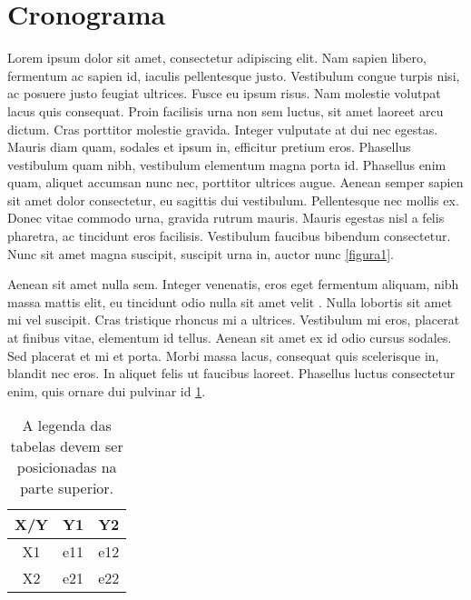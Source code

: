 \section{Cronograma}
Lorem ipsum dolor sit amet, consectetur adipiscing elit. Nam sapien libero, fermentum ac sapien id, iaculis pellentesque justo. Vestibulum congue turpis nisi, ac posuere justo feugiat ultrices. Fusce eu ipsum risus. Nam molestie volutpat lacus quis consequat. Proin facilisis urna non sem luctus, sit amet laoreet arcu dictum. Cras porttitor molestie gravida. Integer vulputate at dui nec egestas. Mauris diam quam, sodales et ipsum in, efficitur pretium eros. Phasellus vestibulum quam nibh, vestibulum elementum magna porta id. Phasellus enim quam, aliquet accumsan nunc nec, porttitor ultrices augue. Aenean semper sapien sit amet dolor consectetur, eu sagittis dui vestibulum. Pellentesque nec mollis ex. Donec vitae commodo urna, gravida rutrum mauris. Mauris egestas nisl a felis pharetra, ac tincidunt eros facilisis. Vestibulum faucibus bibendum consectetur. Nunc sit amet magna suscipit, suscipit urna in, auctor nunc \ref{figura1}.

Aenean sit amet nulla sem. Integer venenatis, eros eget fermentum aliquam, nibh massa mattis elit, eu tincidunt odio nulla sit amet velit \cite{knuth:84}. Nulla lobortis sit amet mi vel suscipit. Cras tristique rhoncus mi a ultrices. Vestibulum mi eros, placerat at finibus vitae, elementum id tellus. Aenean sit amet ex id odio cursus sodales. Sed placerat et mi et porta. Morbi massa lacus, consequat quis scelerisque in, blandit nec eros. In aliquet felis ut faucibus laoreet. Phasellus luctus consectetur enim, quis ornare dui pulvinar id \ref{tabela1}.

\begin{table}
    \label{tabela1}
    \centering
    \caption{A legenda das tabelas devem ser posicionadas na parte superior.}
    \begin{tabular}{ |c|c c| }
         \hline
         X/Y & Y1 & Y2 \\ \hline
         X1 & e11 & e12 \\ 
         X2 & e21 & e22 \\ 
         \hline
    \end{tabular}
\end{table}